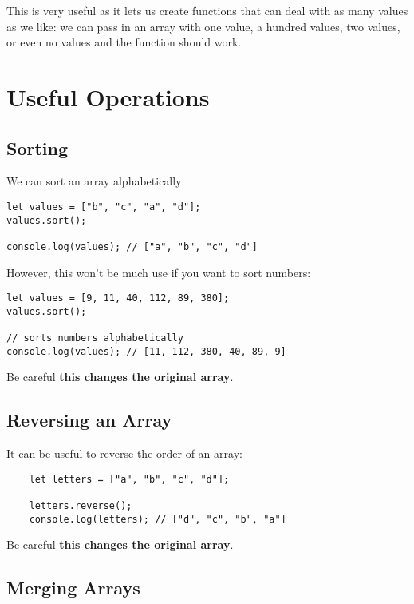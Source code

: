 This is very useful as it lets us create functions that can deal with as many values as we like: we can pass in an array with one value, a hundred values, two values, or even no values and the function should work.

\pagebreak

\section{Useful Operations}

\subsection{Sorting}

We can sort an array alphabetically:

\begin{verbatim}
let values = ["b", "c", "a", "d"];
values.sort();

console.log(values); // ["a", "b", "c", "d"]
\end{verbatim}

However, this won't be much use if you want to sort numbers:

\begin{verbatim}
let values = [9, 11, 40, 112, 89, 380];
values.sort();

// sorts numbers alphabetically
console.log(values); // [11, 112, 380, 40, 89, 9]
\end{verbatim}

Be careful \textbf{this changes the original array}.


\subsection{Reversing an Array}

It can be useful to reverse the order of an array:

\begin{verbatim}
    let letters = ["a", "b", "c", "d"];

    letters.reverse();
    console.log(letters); // ["d", "c", "b", "a"]
\end{verbatim}

Be careful \textbf{this changes the original array}.


\subsection{Merging Arrays}

